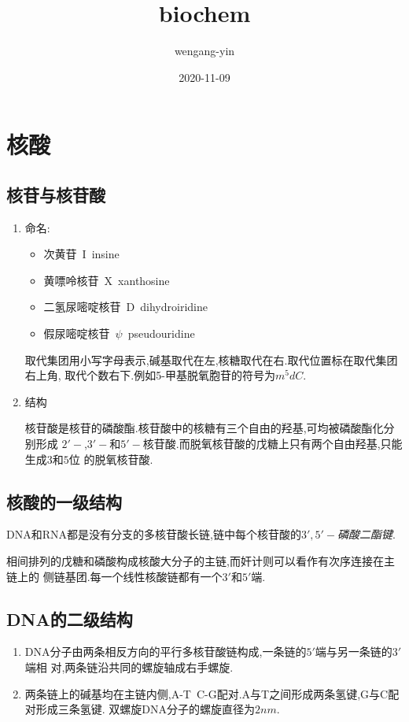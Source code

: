 \documentclass[UTF8]{ctexart}
\title{biochem}
\author{wengang-yin}
\date{2020-11-09}
\begin{document}
\maketitle
\tableofcontents
\section{核酸}
\subsection{核苷与核苷酸}
  \begin{enumerate}
  \item 命名:
    \begin{itemize}
      \item 次黄苷\ I\ insine
      \item 黄嘌呤核苷\ X\ xanthosine
      \item 二氢尿嘧啶核苷\ D\ dihydroiridine
      \item 假尿嘧啶核苷\ $\psi$\  pseudouridine
    \end{itemize}
    \par 取代集团用小写字母表示,碱基取代在左,核糖取代在右.取代位置标在取代集团右上角,
    取代个数右下.例如5-甲基脱氧胞苷的符号为$m^5dC$.
    \item 结构
    \par 核苷酸是核苷的磷酸酯.核苷酸中的核糖有三个自由的羟基,可均被磷酸酯化分别形成
    $2'-$,$3'-$和$5'-$核苷酸.而脱氧核苷酸的戊糖上只有两个自由羟基,只能生成$3$和$5$位
    的脱氧核苷酸.
  \end{enumerate}
  \subsection{核酸的一级结构}
  \par DNA和RNA都是没有分支的多核苷酸长链,链中每个核苷酸的\emph{\large $3',5'-$磷酸二酯键}.
  \par 相间排列的戊糖和磷酸构成核酸大分子的主链,而奸计则可以看作有次序连接在主链上的
  侧链基团.每一个线性核酸链都有一个$3'$和$5'$端.
  \subsection{DNA的二级结构}
  \begin{enumerate}
    \item DNA分子由两条相反方向的平行多核苷酸链构成,一条链的$5'$端与另一条链的$3'$端相
    对,两条链沿共同的螺旋轴成右手螺旋.
    \item 两条链上的碱基均在主链内侧,A-T\ C-G配对.A与T之间形成两条氢键,G与C配对形成三条氢键.
    双螺旋DNA分子的螺旋直径为$2nm$.
  \end{enumerate}
\end{document}
